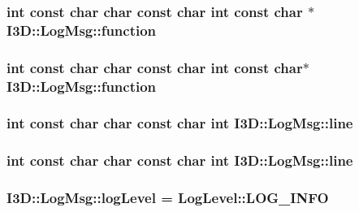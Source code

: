 \subsubsection[{\texorpdfstring{function}{function}}]{\setlength{\rightskip}{0pt plus 5cm}int const char char const char int const char $\ast$ I3\+D\+::\+Log\+Msg\+::function}\hypertarget{class_i3_d_1_1_log_msg_aadb5ccd21e1dbbd3d40b631146dbddd3}{}\label{class_i3_d_1_1_log_msg_aadb5ccd21e1dbbd3d40b631146dbddd3}
\subsubsection[{\texorpdfstring{function}{function}}]{\setlength{\rightskip}{0pt plus 5cm}int const char char const char int const char$\ast$ I3\+D\+::\+Log\+Msg\+::function}\hypertarget{class_i3_d_1_1_log_msg_a474c5077b30bea5b07a1a6ef7f2d82ea}{}\label{class_i3_d_1_1_log_msg_a474c5077b30bea5b07a1a6ef7f2d82ea}
\subsubsection[{\texorpdfstring{line}{line}}]{\setlength{\rightskip}{0pt plus 5cm}int const char char const char int I3\+D\+::\+Log\+Msg\+::line}\hypertarget{class_i3_d_1_1_log_msg_a56ecd5ab4bfe94a82004dbeca84915b5}{}\label{class_i3_d_1_1_log_msg_a56ecd5ab4bfe94a82004dbeca84915b5}
\subsubsection[{\texorpdfstring{line}{line}}]{\setlength{\rightskip}{0pt plus 5cm}int const char char const char int I3\+D\+::\+Log\+Msg\+::line}\hypertarget{class_i3_d_1_1_log_msg_a56ecd5ab4bfe94a82004dbeca84915b5}{}\label{class_i3_d_1_1_log_msg_a56ecd5ab4bfe94a82004dbeca84915b5}
\subsubsection[{\texorpdfstring{log\+Level}{logLevel}}]{ I3\+D\+::\+Log\+Msg\+::log\+Level = {\bf Log\+Level\+::\+L\+O\+G\+\_\+\+I\+N\+FO}\hspace{0.3cm}{\ttfamily [static]}}\hypertarget{class_i3_d_1_1_log_msg_a1a45bf0f5753da52a4a8ddf930c11ff8}{}\label{class_i3_d_1_1_log_msg_a1a45bf0f5753da52a4a8ddf930c11ff8}


